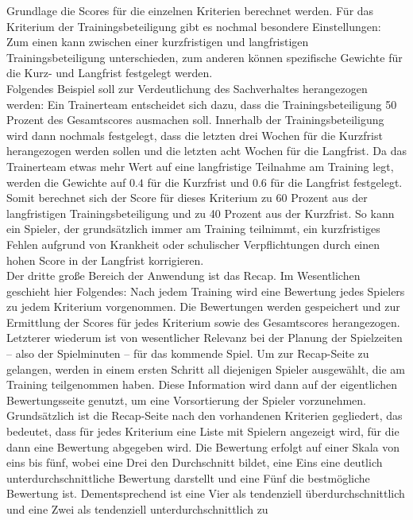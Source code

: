 Grundlage die Scores für die einzelnen Kriterien berechnet werden. Für das 
Kriterium der Trainingsbeteiligung gibt es nochmal besondere Einstellungen: Zum 
einen kann zwischen einer kurzfristigen und langfristigen Trainingsbeteiligung 
unterschieden, zum anderen können spezifische Gewichte für die Kurz- und Langfrist 
festgelegt werden. \\ 
Folgendes Beispiel soll zur Verdeutlichung des Sachverhaltes herangezogen werden: 
Ein Trainerteam entscheidet sich dazu, dass die Trainingsbeteiligung 50 Prozent 
des Gesamtscores ausmachen soll. Innerhalb der Trainingsbeteiligung wird dann 
nochmals festgelegt, dass die letzten drei Wochen für die Kurzfrist herangezogen 
werden sollen und die letzten acht Wochen für die Langfrist. Da das Trainerteam 
etwas mehr Wert auf eine langfristige Teilnahme am Training legt, werden die 
Gewichte auf $ 0.4 $ für die Kurzfrist und $ 0.6 $ für die Langfrist festgelegt. 
Somit berechnet sich der Score für dieses Kriterium zu 60 Prozent aus der 
langfristigen Trainingsbeteiligung und zu 40 Prozent aus der Kurzfrist. So kann 
ein Spieler, der grundsätzlich immer am Training teilnimmt, ein kurzfristiges 
Fehlen aufgrund von Krankheit oder schulischer Verpflichtungen durch einen hohen 
Score in der Langfrist korrigieren. \\ 
Der dritte große Bereich der Anwendung ist das Recap. Im Wesentlichen geschieht 
hier Folgendes: Nach jedem Training wird eine Bewertung jedes Spielers zu jedem 
Kriterium vorgenommen. Die Bewertungen werden gespeichert und zur Ermittlung der 
Scores für jedes Kriterium sowie des Gesamtscores herangezogen. Letzterer wiederum 
ist von wesentlicher Relevanz bei der Planung der Spielzeiten -- also der 
Spielminuten -- für das kommende Spiel. Um zur Recap-Seite zu gelangen, werden in 
einem ersten Schritt all diejenigen Spieler ausgewählt, die am Training 
teilgenommen haben. Diese Information wird dann auf der eigentlichen 
Bewertungsseite genutzt, um eine Vorsortierung der Spieler vorzunehmen. \\ 
Grundsätzlich ist die Recap-Seite nach den vorhandenen Kriterien 
gegliedert, das bedeutet, dass für jedes Kriterium eine Liste mit Spielern 
angezeigt wird, für die dann eine Bewertung abgegeben wird. Die Bewertung erfolgt 
auf einer Skala von eins bis fünf, wobei eine Drei den Durchschnitt bildet, eine 
Eins eine deutlich unterdurchschnittliche Bewertung darstellt und eine Fünf die 
bestmögliche Bewertung ist. Dementsprechend ist eine Vier als tendenziell 
überdurchschnittlich und eine Zwei als tendenziell unterdurchschnittlich zu 
